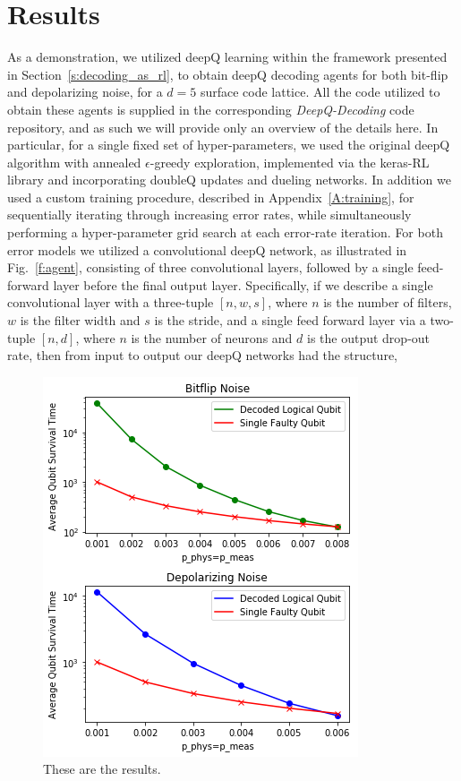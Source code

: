 \documentclass[twocolumn,preprintnumbers,amsmath,amssymb,notitlepage,nofootinbib,longbibliography,superscriptaddress,aps,pra,10pt]{revtex4-1}
\begin{document}
\section{Results}\label{s:results}

	As a demonstration, we utilized deepQ learning within the framework presented in Section~\ref{s:decoding_as_rl}, to obtain deepQ decoding agents for both bit-flip and depolarizing noise, for a $d=5$ surface code lattice.
	All the code utilized to obtain these agents is supplied in the corresponding \textit{DeepQ-Decoding} code repository, and as such we will provide only an overview of the details here.
	In particular, for a single fixed set of hyper-parameters, we used the original deepQ algorithm with annealed $\epsilon$-greedy exploration, implemented via the keras-RL library and incorporating doubleQ updates and dueling networks.
	In addition we used a custom training procedure, described in Appendix~\ref{A:training}, for sequentially iterating through increasing error rates, while simultaneously performing a hyper-parameter grid search at each error-rate iteration.
	For both error models we utilized a convolutional deepQ network, as illustrated in Fig.~\ref{f:agent}, consisting of three convolutional layers, followed by a single feed-forward layer before the final output layer.
	Specifically, if we describe a single convolutional layer with a three-tuple $[n,w,s]$, where $n$ is the number of filters, $w$ is the filter width and $s$ is the stride, and a single feed forward layer via a two-tuple $[n,d]$, where $n$ is the number of neurons and $d$ is the output drop-out rate, then from input to output our deepQ networks had the structure,

	\begin{figure}
		\centering
		\includegraphics[width=0.8\linewidth]{figures/results.png}
		\caption{
			These are the results.
		}
		\label{f:results}
	\end{figure}
\end{document}
